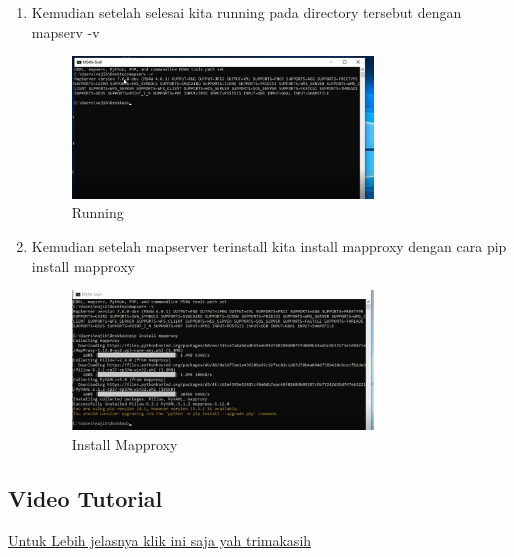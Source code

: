 \begin{enumerate}
    \item Kemudian setelah selesai kita running pada directory tersebut dengan mapserv -v  
    \hfill\break
	\begin{figure}[H]
		\includegraphics[width=8cm]{figures/1174042/T44.JPG}
		\centering
		\caption{Running}
	\end{figure}
	
    \item Kemudian setelah mapserver terinstall kita install mapproxy dengan cara pip install mapproxy
    \hfill\break
	\begin{figure}[H]
		\includegraphics[width=8cm]{figures/1174042/T45.JPG}
		\centering
		\caption{Install Mapproxy}
	\end{figure}
\end{enumerate}

\subsection{Video Tutorial}
\href{https://www.youtube.com/watch?v=mYyPH4ofPxo}{Untuk Lebih jelasnya klik ini saja yah trimakasih}
